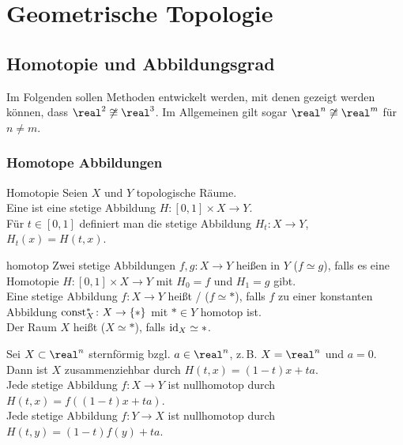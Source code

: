 \section{%
    Geometrische Topologie%
}

\subsection{%
    Homotopie und Abbildungsgrad%
}

\begin{Bem}
    Im Folgenden sollen Methoden entwickelt werden, mit denen gezeigt werden
    können, dass $\real^2 \not\cong \real^3$.
    Im Allgemeinen gilt sogar $\real^n \not\cong \real^m$ für $n \not= m$.
\end{Bem}

\subsubsection{%
    Homotope Abbildungen%
}

\begin{Def}{Homotopie}
    Seien $X$ und $Y$ topologische Räume. \\
    Eine  ist eine stetige Abbildung
    $H\colon [0, 1] \times X \rightarrow Y$. \\
    Für $t \in [0, 1]$ definiert man die stetige Abbildung
    $H_t\colon X \rightarrow Y$, $H_t(x) = H(t, x)$.
\end{Def}

\begin{Def}{homotop}
    Zwei stetige Abbildungen $f, g\colon X \rightarrow Y$ heißen
     in $Y$ ($f \simeq g$), falls es eine Homotopie
    $H\colon [0, 1] \times X \rightarrow Y$
    mit $H_0 = f$ und $H_1 = g$ gibt. \\
    Eine stetige Abbildung $f\colon X \rightarrow Y$ heißt
    / ($f \simeq \ast$),
    falls $f$ zu einer konstanten Abbildung
    $\operatorname{const}_X^\ast\colon X \rightarrow \{\ast\}$
    mit $\ast \in Y$ homotop ist. \\
    Der Raum $X$ heißt  ($X \simeq \ast$),
    falls $\operatorname{id}_X \simeq \ast$.
\end{Def}

\begin{Bsp}
    Sei $X \subset \real^n$ sternförmig bzgl. $a \in \real^n$,
    z.\,B. $X = \real^n$ und $a = 0$. \\
    Dann ist $X$ zusammenziehbar durch $H(t, x) = (1 - t)x + ta$. \\
    Jede stetige Abbildung $f\colon X \rightarrow Y$ ist nullhomotop
    durch $H(t, x) = f((1 - t)x + ta)$. \\
    Jede stetige Abbildung $f\colon Y \rightarrow X$ ist nullhomotop
    durch $H(t, y) = (1 - t)f(y) + ta$.
\end{Bsp}

